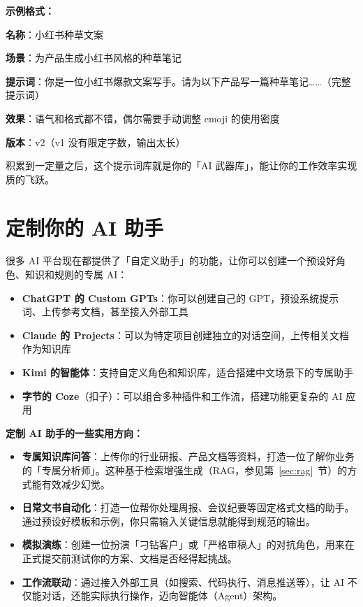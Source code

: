 \textbf{示例格式：}

\begin{promptbox}
\textbf{名称}：小红书种草文案

\textbf{场景}：为产品生成小红书风格的种草笔记

\textbf{提示词}：你是一位小红书爆款文案写手。请为以下产品写一篇种草笔记……（完整提示词）

\textbf{效果}：语气和格式都不错，偶尔需要手动调整 emoji 的使用密度

\textbf{版本}：v2（v1 没有限定字数，输出太长）
\end{promptbox}

积累到一定量之后，这个提示词库就是你的「AI 武器库」，能让你的工作效率实现质的飞跃。

\section{定制你的 AI 助手}

很多 AI 平台现在都提供了「自定义助手」的功能，让你可以创建一个预设好角色、知识和规则的专属 AI：

\begin{itemize}
  \item \textbf{ChatGPT 的 Custom GPTs}：你可以创建自己的 GPT，预设系统提示词、上传参考文档，甚至接入外部工具
  \item \textbf{Claude 的 Projects}：可以为特定项目创建独立的对话空间，上传相关文档作为知识库
  \item \textbf{Kimi 的智能体}：支持自定义角色和知识库，适合搭建中文场景下的专属助手
  \item \textbf{字节的 Coze}（扣子）：可以组合多种插件和工作流，搭建功能更复杂的 AI 应用
\end{itemize}

\textbf{定制 AI 助手的一些实用方向：}

\begin{itemize}
  \item \textbf{专属知识库问答}：上传你的行业研报、产品文档等资料，打造一位了解你业务的「专属分析师」。这种基于检索增强生成（RAG，参见第~\ref{sec:rag}~节）的方式能有效减少幻觉。
  \item \textbf{日常文书自动化}：打造一位帮你处理周报、会议纪要等固定格式文档的助手。通过预设好模板和示例，你只需输入关键信息就能得到规范的输出。
  \item \textbf{模拟演练}：创建一位扮演「刁钻客户」或「严格审稿人」的对抗角色，用来在正式提交前测试你的方案、文档是否经得起挑战。
  \item \textbf{工作流联动}：通过接入外部工具（如搜索、代码执行、消息推送等），让 AI 不仅能对话，还能实际执行操作，迈向智能体（Agent）架构。
\end{itemize}

